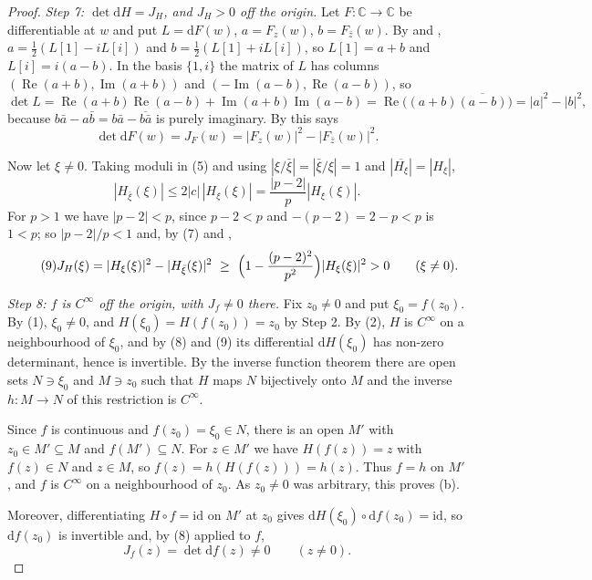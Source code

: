 \begin{proof}
\emph{Step 7: $\det\mathrm{d}H=J_H$, and $J_H>0$ off the origin.}  Let
$F\colon\mathbb{C}\to\mathbb{C}$ be differentiable at $w$ and put
$L=\mathrm{d}F(w)$, $a=F_z(w)$, $b=F_{\bar z}(w)$.  By  and
, $a=\tfrac12(L[1]-iL[i])$ and $b=\tfrac12(L[1]+iL[i])$, so
$L[1]=a+b$ and $L[i]=i(a-b)$.  In the basis $\{1,i\}$ the matrix of $L$ has
columns $(\operatorname{Re}(a+b),\operatorname{Im}(a+b))$ and
$(-\operatorname{Im}(a-b),\operatorname{Re}(a-b))$, so
\[
  \det L=\operatorname{Re}(a+b)\operatorname{Re}(a-b)
    +\operatorname{Im}(a+b)\operatorname{Im}(a-b)
  =\operatorname{Re}\bigl((a+b)\overline{(a-b)}\bigr)=|a|^{2}-|b|^{2},
\]
because $b\bar a-a\bar b=b\bar a-\overline{b\bar a}$ is purely imaginary.  By
 this says
\begin{equation}\tag{8}
  \det\mathrm{d}F(w)=J_F(w)=|F_z(w)|^{2}-|F_{\bar z}(w)|^{2}.
\end{equation}

Now let $\xi\neq0$.  Taking moduli in (5) and using
$|\xi/\bar\xi|=|\bar\xi/\xi|=1$ and
$|\overline{H_\xi}|=|H_\xi|$,
\[
  |H_{\bar\xi}(\xi)|\le2|c|\,|H_\xi(\xi)|=\frac{|p-2|}{p}|H_\xi(\xi)| .
\]
For $p>1$ we have $|p-2|<p$, since $p-2<p$ and $-(p-2)=2-p<p$ is
$1<p$; so $|p-2|/p<1$ and, by (7) and ,
\begin{equation}\tag{9}
  J_H(\xi)=|H_\xi(\xi)|^{2}-|H_{\bar\xi}(\xi)|^{2}
  \ \ge\ \Bigl(1-\frac{(p-2)^{2}}{p^{2}}\Bigr)|H_\xi(\xi)|^{2}>0
  \qquad(\xi\neq0).
\end{equation}

\emph{Step 8: $f$ is $C^\infty$ off the origin, with $J_f\neq0$ there.}  Fix
$z_0\neq0$ and put $\xi_0=f(z_0)$.  By (1), $\xi_0\neq0$, and
$H(\xi_0)=H(f(z_0))=z_0$ by Step 2.  By (2), $H$ is $C^\infty$ on a
neighbourhood of $\xi_0$, and by (8) and (9) its differential
$\mathrm{d}H(\xi_0)$ has non-zero determinant, hence is invertible.  By the
inverse function theorem there are open sets $N\ni\xi_0$ and $M\ni z_0$ such
that $H$ maps $N$ bijectively onto $M$ and the inverse
$h\colon M\to N$ of this restriction is $C^\infty$.

Since $f$ is continuous and $f(z_0)=\xi_0\in N$, there is an open $M'$ with
$z_0\in M'\subseteq M$ and $f(M')\subseteq N$.  For $z\in M'$ we have
$H(f(z))=z$ with $f(z)\in N$ and $z\in M$, so $f(z)=h(H(f(z)))=h(z)$.  Thus
$f=h$ on $M'$, and $f$ is $C^\infty$ on a neighbourhood of $z_0$.  As
$z_0\neq0$ was arbitrary, this proves (b).

Moreover, differentiating $H\circ f=\mathrm{id}$ on $M'$ at $z_0$ gives
$\mathrm{d}H(\xi_0)\circ\mathrm{d}f(z_0)=\mathrm{id}$, so $\mathrm{d}f(z_0)$ is
invertible and, by (8) applied to $f$,
\begin{equation}\tag{10}
  J_f(z)=\det\mathrm{d}f(z)\neq0\qquad(z\neq0).
\end{equation}


\end{proof}
